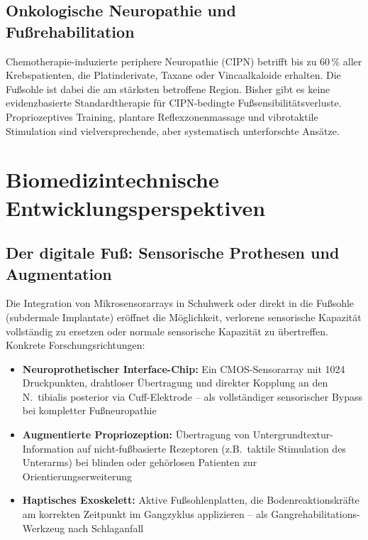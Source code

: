 ﻿\documentclass[12pt,a4paper]{report}
\theoremstyle{plain}
\theoremstyle{definition}
\theoremstyle{remark}
\begin{document}
\subsection{Onkologische Neuropathie und Fußrehabilitation}

Chemotherapie-induzierte periphere Neuropathie (CIPN) betrifft
bis zu 60\,\% aller Krebspatienten, die Platinderivate,
Taxane oder Vincaalkaloide erhalten. Die Fußsohle ist dabei
die am stärksten betroffene Region. Bisher gibt es keine
evidenzbasierte Standardtherapie für CIPN-bedingte
Fußsensibilitätsverluste. Propriozeptives Training, plantare
Reflexzonenmassage und vibrotaktile Stimulation sind
vielversprechende, aber systematisch unterforschte Ansätze.

\section{Biomedizintechnische Entwicklungsperspektiven}

\subsection{Der digitale Fuß: Sensorische Prothesen und Augmentation}

Die Integration von Mikrosensorarrays in Schuhwerk oder direkt in
die Fußsohle (subdermale Implantate) eröffnet die Möglichkeit,
verlorene sensorische Kapazität vollständig zu ersetzen oder
normale sensorische Kapazität zu übertreffen. Konkrete
Forschungsrichtungen:

\begin{itemize}
\item \textbf{Neuroprothetischer Interface-Chip:} Ein CMOS-Sensorarray
  mit 1024 Druckpunkten, drahtloser Übertragung und direkter
  Kopplung an den N.\ tibialis posterior via Cuff-Elektrode --
  als vollständiger sensorischer Bypass bei kompletter Fußneuropathie
\item \textbf{Augmentierte Propriozeption:} Übertragung von
  Untergrundtextur-Information auf nicht-fußbasierte Rezeptoren
  (z.B.\ taktile Stimulation des Unterarms) bei blinden oder
  gehörlosen Patienten zur Orientierungserweiterung
\item \textbf{Haptisches Exoskelett:} Aktive Fußsohlenplatten,
  die Bodenreaktionskräfte am korrekten Zeitpunkt im Gangzyklus
  applizieren -- als Gangrehabilitations-Werkzeug nach Schlaganfall
\end{itemize}
\end{document}

